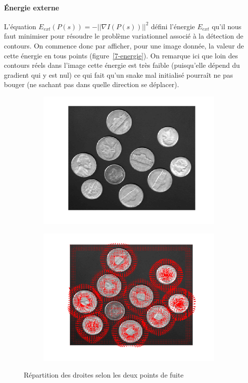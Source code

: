\documentclass{article}
\begin{document}
\paragraph{Énergie externe}
L'équation $E_{ext}(P(s)) = - ||\nabla I(P(s))||^2$ défini l'énergie $E_{ext}$ qu'il nous faut minimiser pour résoudre le problème variationnel associé à la détection de contours. On commence donc par afficher, pour une image donnée, la valeur de cette énergie en tous points (figure~\ref{7-energie}). On remarque ici que loin des contours réels dans l'image cette énergie est très faible (puisqu'elle dépend du gradient qui y est nul) ce qui fait qu'un snake mal initialisé pourraît ne pas bouger (ne sachant pas dans quelle direction se déplacer).
\begin{figure}[!ht]
    \centering
    \begin{subfigure}[c]{0.49\linewidth}
        \centering
        \includegraphics[width=\linewidth]{images/7-pieces.png}
    \end{subfigure}
    \hfill
    \begin{subfigure}[c]{0.49\linewidth}
        \centering
        \includegraphics[width=\linewidth]{images/7-champ_forces_externe.png}
    \end{subfigure}
    \caption{Répartition des droites selon les deux points de fuite}
    \label{5-T-grand}
\end{figure}
\end{document}
